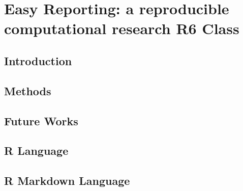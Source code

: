 \documentclass[b5paper,oneside,british,intoc,bibliograph=totoc,index=totoc,BCOR10mm,twoside,openright]{book}
\numberwithin{equation}{section}
\numberwithin{figure}{section}
\begin{document}
\chapter{Easy Reporting: a reproducible computational research R6 Class}

\section{Introduction} 

\section{Methods}

\section{Future Works}


\begin{appendices}
\section{R Language} \label{sec:rlang}
\section{R Markdown Language} \label{sec:rmarkdown}
%
%
%
\end{appendices}

%
%
%
%
%
%

%
%
%


\printbibliography[heading=bibnumbered]
\cleardoublepage

\printglossaries

\cleardoublepage
{}
\listoffigures

\cleardoublepage
{}
\listoftables

\end{document}
